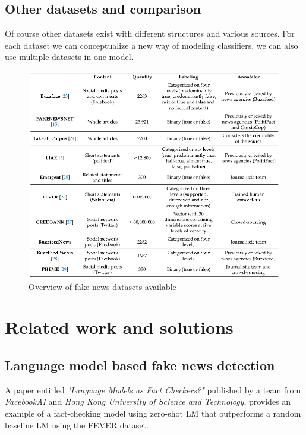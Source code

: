 \documentclass[10pt, english]{report}
\begin{document}
\newpage
\section{Other datasets and comparison \cite{de2021identifying}}
Of course other datasets exist with different structures and various sources. For each dataset we can conceptualize a new way of modeling classifiers, we can also use multiple datasets in one model.\\
 
\begin{figure}[H]
	\centering
	\includegraphics[scale=0.53]{img/datasets_comparison.png}
	\caption{Overview of fake news datasets available \cite{de2021identifying}}
\end{figure}


\chapter{Related work and solutions}
\section{Language model based fake news detection \cite{lee2020language} \cite{petroni2019language}}
A paper entitled \textit{"Language Models as Fact Checkers?"} published by a team from \textit{FacebookAI} and \textit{Hong Kong University of Science and Technology}, provides an example of a fact-checking model using zero-shot LM that outperforms a random baseline LM using the FEVER dataset\cite{thorne2018fever}.\\
\end{document}
